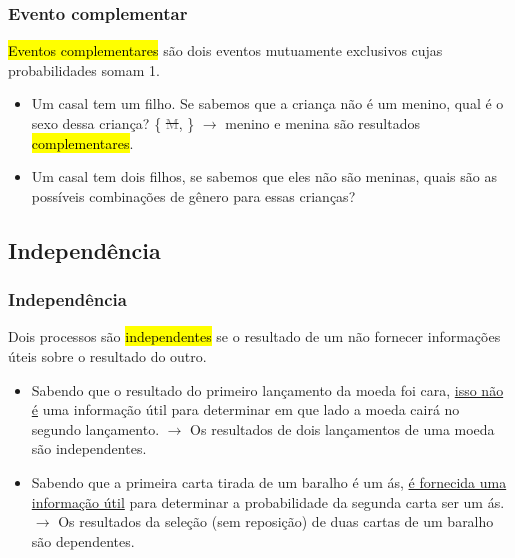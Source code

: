 \begin{frame}
\frametitle{Evento complementar}

\justifying
\hl{Eventos complementares} são dois eventos mutuamente exclusivos cujas probabilidades somam 1.

\begin{itemize}
\justifying
\item Um casal tem um filho. Se sabemos que a criança não é um menino, qual é o sexo dessa criança?
\justifying
\{ \sout{\textcolor{gray}{M}},  \} $\rightarrow$ menino e menina são resultados \hl{complementares}.
\justifying
\item Um casal tem dois filhos, se sabemos que eles não são meninas, quais são as possíveis combinações de gênero para essas crianças?
\end{itemize}

\end{frame}


\subsection{Independência}


\begin{frame}
\frametitle{Independência}
\justifying
Dois processos são \hl{independentes} se o resultado de um não fornecer informações úteis sobre o resultado do outro.

\pause

\begin{itemize}
\justifying
\justifying
\item Sabendo que o resultado do primeiro lançamento da moeda foi cara, \underline{isso não é} uma informação útil para determinar em que lado a moeda cairá no segundo lançamento. $\rightarrow$ Os resultados de dois lançamentos de uma moeda são independentes.

\pause
\justifying
\item Sabendo que a primeira carta tirada de um baralho é um ás, \underline{é fornecida uma informação útil} para determinar a probabilidade da segunda carta ser um ás. $\rightarrow$ Os resultados da seleção (sem reposição) de duas cartas de um baralho são dependentes.

\end{itemize}

\end{frame}

